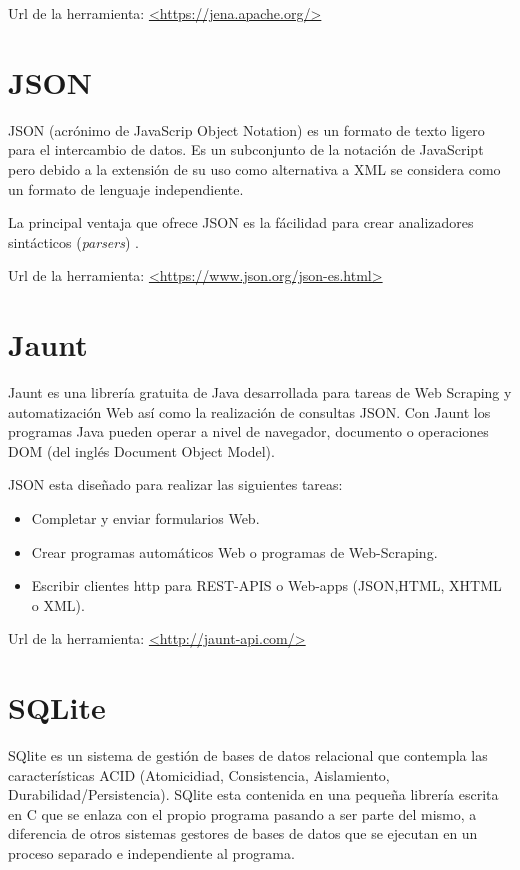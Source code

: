 Url de la herramienta: \url{<https://jena.apache.org/>}

\newpage
\section{JSON}

JSON (acrónimo de JavaScrip Object Notation) es un formato de texto ligero para el intercambio de datos. Es un subconjunto de la notación de JavaScript pero debido a la extensión de su uso como alternativa a XML se considera como un formato de lenguaje independiente.

La principal ventaja que ofrece JSON es la fácilidad para crear analizadores sintácticos (\textit{parsers}) \cite{wiki:JSON}.

Url de la herramienta: \url{<https://www.json.org/json-es.html>}

\section{Jaunt}

Jaunt es una librería gratuita de Java desarrollada para tareas de Web Scraping y automatización Web así como la realización de consultas JSON. Con Jaunt los programas Java pueden operar a nivel de navegador, documento o operaciones DOM (del inglés Document Object Model).

JSON esta diseñado para realizar las siguientes tareas:
\begin{itemize}
	\item{Completar y enviar formularios Web.}
	\item{Crear programas automáticos Web o programas de Web-Scraping.}
	\item{Escribir clientes http para REST-APIS o Web-apps (JSON,HTML,
	XHTML o XML).}
\end{itemize}

Url de la herramienta: \url{<http://jaunt-api.com/>}
\section{SQLite}

SQlite es un sistema de gestión de bases de datos relacional que contempla las características ACID (Atomicidiad, Consistencia, Aislamiento, Durabilidad/Persistencia). SQlite esta contenida en una pequeña librería escrita en C que se enlaza con el propio programa pasando a ser parte del mismo, a diferencia de otros sistemas gestores de bases de datos que se ejecutan en un proceso separado e independiente al programa.

